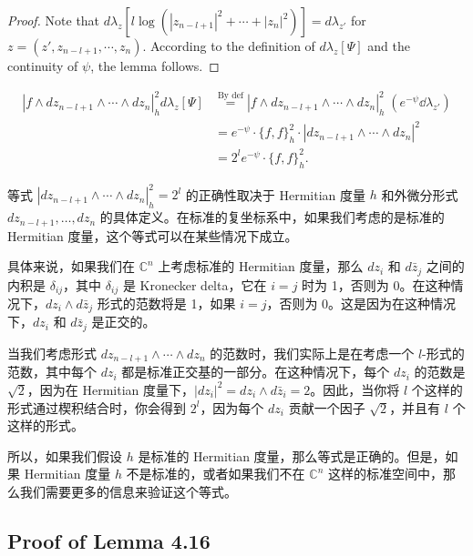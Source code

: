   \begin{proof}
  Note that $d\lambda_{z}[l\log(|z_{n-l+1}|^{2}+\cdots+|z_{n}|^{2})] =
  d\lambda_{z'}$ for $z=(z',z_{n-l+1},\cdots,z_{n})$. According to the
  definition of  $d\lambda_{z}[\Psi]$
  and the continuity of $\psi$, the lemma follows.
  \end{proof}

\begin{remark}
\begin{align*}
  |f\wedge dz_{n-l+1}\wedge\cdots\wedge dz_{n}|^{2}_{h}d\lambda_{z}[\Psi] &\stackrel{\text{By def}}{=}  |f\wedge dz_{n-l+1}\wedge\cdots\wedge dz_{n}|^{2}_{h}\; (e^{-\psi} \dd \lambda_{z'})\\ 
  &= e^{-\psi}  \cdot \{f,f\}^2_h \cdot |dz_{n-l+1}\wedge\cdots\wedge dz_{n}|^{2}\\ 
  &= 2^l e^{-\psi}  \cdot \{f,f\}^2_h.
\end{align*}
  

  等式 $|d z_{n-l+1} \wedge \cdots \wedge d z_n|_h^2 = 2^l$ 的正确性取决于 Hermitian 度量 $h$ 和外微分形式 $d z_{n-l+1}, \ldots, d z_n$ 的具体定义。在标准的复坐标系中，如果我们考虑的是标准的 Hermitian 度量，这个等式可以在某些情况下成立。

  具体来说，如果我们在 $\mathbb{C}^n$ 上考虑标准的 Hermitian 度量，那么 $dz_i$ 和 $d\bar{z}_j$ 之间的内积是 $\delta_{ij}$，其中 $\delta_{ij}$ 是 Kronecker delta，它在 $i = j$ 时为 1，否则为 0。在这种情况下，$dz_i \wedge d\bar{z}_j$ 形式的范数将是 1，如果 $i = j$，否则为 0。这是因为在这种情况下，$dz_i$ 和 $d\bar{z}_j$ 是正交的。
  
  当我们考虑形式 $d z_{n-l+1} \wedge \cdots \wedge d z_n$ 的范数时，我们实际上是在考虑一个 $l$-形式的范数，其中每个 $dz_i$ 都是标准正交基的一部分。在这种情况下，每个 $dz_i$ 的范数是 $\sqrt{2}$，因为在 Hermitian 度量下，$|dz_i|^2 = dz_i \wedge d\bar{z}_i = 2$。因此，当你将 $l$ 个这样的形式通过楔积结合时，你会得到 $2^l$，因为每个 $dz_i$ 贡献一个因子 $\sqrt{2}$，并且有 $l$ 个这样的形式。
  
  所以，如果我们假设 $h$ 是标准的 Hermitian 度量，那么等式是正确的。但是，如果 Hermitian 度量 $h$ 不是标准的，或者如果我们不在 $\mathbb{C}^n$ 这样的标准空间中，那么我们需要更多的信息来验证这个等式。

\end{remark}

\subsection{Proof of Lemma 4.16}

